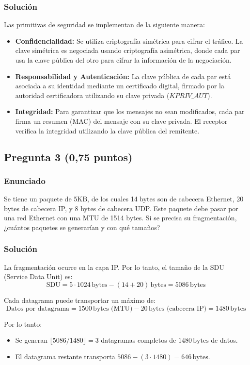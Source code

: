 \documentclass[12pt]{article}
\begin{document}
\subsubsection{Solución}
Las primitivas de seguridad se implementan de la siguiente manera:  
\begin{itemize}
    \item \textbf{Confidencialidad:}  
    Se utiliza criptografía simétrica para cifrar el tráfico. La clave simétrica es negociada usando criptografía asimétrica, donde cada par usa la clave pública del otro para cifrar la información de la negociación.
    \item \textbf{Responsabilidad y Autenticación:}  
    La clave pública de cada par está asociada a su identidad mediante un certificado digital, firmado por la autoridad certificadora utilizando su clave privada (\( KPRIV\_AUT \)).
    \item \textbf{Integridad:}  
    Para garantizar que los mensajes no sean modificados, cada par firma un resumen (MAC) del mensaje con su clave privada. El receptor verifica la integridad utilizando la clave pública del remitente.
\end{itemize}

\subsection{Pregunta 3 (0,75 puntos)}
\subsubsection{Enunciado}
Se tiene un paquete de 5KB, de los cuales 14 bytes son de cabecera Ethernet, 20 bytes de cabecera IP, y 8 bytes de cabecera UDP. Este paquete debe pasar por una red Ethernet con una MTU de 1514 bytes. Si se precisa su fragmentación, ¿cuántos paquetes se generarían y con qué tamaños?

\subsubsection{Solución}
La fragmentación ocurre en la capa IP. Por lo tanto, el tamaño de la SDU (Service Data Unit) es:  
\[ \text{SDU} = 5 \cdot 1024 \, \text{bytes} - (14 + 20) \, \text{bytes} = 5086 \, \text{bytes} \]  

Cada datagrama puede transportar un máximo de:  
\[ \text{Datos por datagrama} = 1500 \, \text{bytes (MTU)} - 20 \, \text{bytes (cabecera IP)} = 1480 \, \text{bytes} \]  

Por lo tanto:  
\begin{itemize}
    \item Se generan \( \lfloor 5086 / 1480 \rfloor = 3 \) datagramas completos de \( 1480 \, \text{bytes} \) de datos.
    \item El datagrama restante transporta \( 5086 - (3 \cdot 1480) = 646 \, \text{bytes} \).
\end{itemize}
\end{document}
